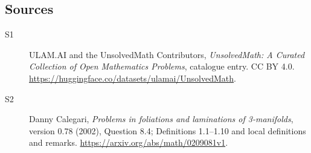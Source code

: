 \documentclass[11pt]{article}
\begin{document}
\subsection{Sources}
\begin{description}
\item[\hypertarget{source:statement:1}{S1}] ULAM.AI and the UnsolvedMath Contributors, \emph{UnsolvedMath: A Curated Collection of Open Mathematics Problems}, catalogue entry. CC BY 4.0. \url{https://huggingface.co/datasets/ulamai/UnsolvedMath}.
\item[\hypertarget{source:statement:2}{S2}] Danny Calegari, \emph{Problems in foliations and laminations of 3-manifolds}, version 0.78 (2002), Question 8.4; Definitions 1.1--1.10 and local definitions and remarks. \url{https://arxiv.org/abs/math/0209081v1}.
\end{description}
\label{end:statement}
\end{document}
